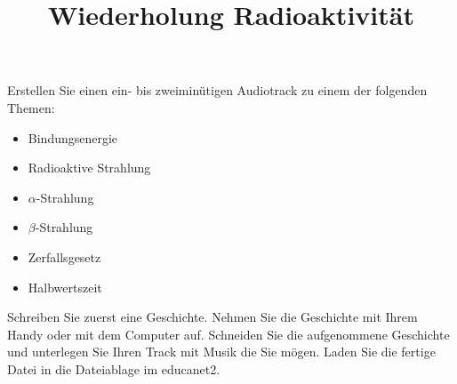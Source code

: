 \documentclass[12pt,a5paper, twosite]{article}
\author{}
\date{}
\title{Wiederholung Radioaktivität}
\begin{document}
\maketitle

Erstellen Sie einen ein- bis zweiminütigen Audiotrack zu einem der folgenden Themen:


\begin{itemize}
	\item Bindungsenergie
	\item Radioaktive Strahlung
	\item $\alpha$-Strahlung
	\item $\beta$-Strahlung
	\item Zerfallsgesetz
	\item Halbwertszeit
\end{itemize}


Schreiben Sie zuerst eine Geschichte.
Nehmen Sie die Geschichte mit Ihrem Handy oder mit dem Computer auf.
Schneiden Sie die aufgenommene Geschichte und unterlegen Sie Ihren Track mit Musik die Sie mögen.
Laden Sie die fertige Datei in die Dateiablage im educanet2.
\end{document}

